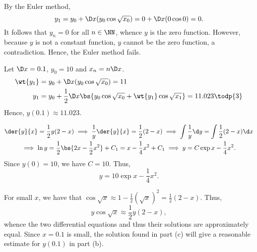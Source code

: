 \begin{solution}
    \begin{ppart}
        By the Euler method, \[y_1 = y_0 + \D x (y_0 \cos \sqrt{x_0}) = 0 + \D x (0 \cos 0) = 0.\] It follows that $y_n = 0$ for all $n \in \NN$, whence $y$ is the zero function. However, because $y$ is not a constant function, $y$ cannot be the zero function, a contradiction. Hence, the Euler method fails.
    \end{ppart}
    \begin{ppart}
        Let $\D x = 0.1$, $y_0 = 10$ and $x_n = n \D x$.
        \begin{align*}
            \wt{y_1} &= y_0 + \D x (y_0 \cos \sqrt{x_0}) = 11\\
            y_1 &= y_0 + \frac12 \D x \bs{y_0 \cos \sqrt{x_0} + \wt{y_1} \cos \sqrt{x_1}} = 11.023 \todp{3}
        \end{align*}
        Hence, $y(0.1) \approx 11.023$.
    \end{ppart}
    \begin{ppart}
        \begin{gather*}
            \der{y}{x} = \frac12 y (2-x) \implies \frac1y \der{y}{x} = \frac12 (2-x) \implies \int \frac1y \d y =\int \frac12 (2-x) \d x\\
            \implies \ln y = \frac12 \bs{2x - \frac12 x^2} + C_1 = x - \frac14 x^2 + C_1 \implies y = C\exp{x - \frac14 x^2}.
        \end{gather*}
        Since $y(0) = 10$, we have $C = 10$. Thus, \[y = 10\exp{x - \frac14 x^2}.\]
    \end{ppart}
    \begin{ppart}
        For small $x$, we have that $\cos \sqrt{x} \approx 1 - \frac12 (\sqrt x)^2 = \frac12 (2 - x)$. Thus, \[y \cos \sqrt x \approx \frac12 y (2-x),\] whence the two differential equations and thus their solutions are approximately equal. Since $x = 0.1$ is small, the solution found in part (c) will give a reasonable estimate for $y(0.1)$ in part (b).
    \end{ppart}
\end{solution}

